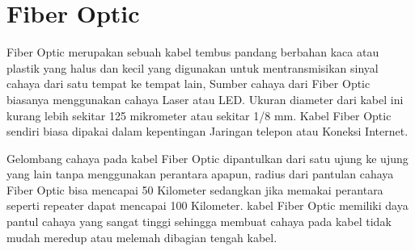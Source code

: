 
\section{Fiber Optic}
\begin{flushleft}
Fiber Optic merupakan sebuah kabel tembus pandang berbahan kaca atau plastik yang halus dan kecil yang digunakan untuk mentransmisikan sinyal cahaya dari satu tempat ke tempat lain, Sumber cahaya dari Fiber Optic biasanya menggunakan cahaya Laser atau LED. Ukuran diameter dari kabel ini kurang lebih sekitar 125 mikrometer atau sekitar 1/8 mm. Kabel Fiber Optic sendiri biasa dipakai dalam kepentingan Jaringan telepon atau Koneksi Internet.
\end{flushleft}
\begin{flushleft}
Gelombang cahaya pada kabel Fiber Optic dipantulkan dari satu ujung ke ujung yang lain tanpa menggunakan perantara apapun, radius dari pantulan cahaya Fiber Optic bisa mencapai 50 Kilometer sedangkan jika memakai perantara seperti repeater dapat mencapai 100 Kilometer. kabel Fiber Optic memiliki daya pantul cahaya yang sangat tinggi sehingga membuat cahaya pada kabel tidak mudah meredup atau melemah dibagian tengah kabel. 
\end{flushleft}
